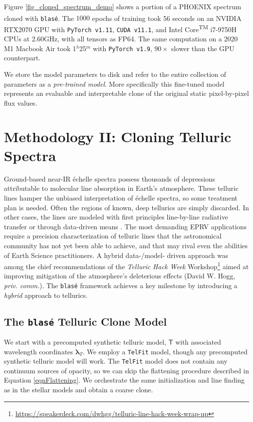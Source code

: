 \documentclass[twocolumn]{aastex631}
\begin{document}
Figure \ref{fig_cloned_spectrum_demo} shows a portion of a PHOENIX spectrum cloned with \texttt{blas\'e}. The $1000$ epochs of training took 56 seconds on an NVIDIA\textsuperscript{\tiny\textregistered} RTX2070 GPU with \texttt{PyTorch v1.11}, \texttt{CUDA v11.1}, and Intel\textsuperscript{\tiny\textregistered} Core\textsuperscript{\tiny TM} i7-9750H CPUs at 2.60GHz, with all tensors as FP64. The same computation on a 2020 M1 Macbook Air took 1$^h$25$^m$ with \texttt{PyTorch v1.9}, $90\times$ slower than the GPU counterpart.

We store the model parameters to disk and refer to the entire collection of parameters as a \emph{pre-trained model}.  More specifically this fine-tuned model represents an evaluable and interpretable clone of the original static pixel-by-pixel flux values.

\section{Methodology II: Cloning Telluric Spectra} \label{sectionTelluric}
Ground-based near-IR \'echelle spectra possess thousands of depressions attributable to molecular line absorption in Earth's atmosphere.  These telluric lines hamper the unbiased interpretation of \'echelle spectra, so some treatment plan is needed.  Often the regions of known, deep tellurics are simply discarded.  In other cases, the lines are modeled with first principles line-by-line radiative transfer \citep[\emph{e.g.} \texttt{TelFit,}][]{2014AJ....148...53G} or through data-driven means \citep[\emph{e.g.} \texttt{wobble,}][]{2019AJ....158..164B}.  The most demanding EPRV applications require a precision characterization of telluric lines that the astronomical community has not yet been able to achieve, and that may rival even the abilities of Earth Science practitioners.  A hybrid data-/model- driven approach was among the chief recommendations of the \emph{Telluric Hack Week} Workshop\footnote{\url{https://speakerdeck.com/dwhgg/telluric-line-hack-week-wrap-up}} aimed at improving mitigation of the atmosphere's deleterious effects (David W. Hogg, \emph{priv. comm.}).  The \texttt{blas\'e} framework achieves a key milestone by introducing a \emph{hybrid} approach to tellurics.

\subsection{The \texttt{blas\'e} Telluric Clone Model}
We start with a precomputed synthetic telluric model, $\mathsf{T}$ with associated wavelength coordinates $\bm{\lambda}_T$.  We employ a \texttt{TelFit} model, though any precomputed synthetic telluric model will work.  The \texttt{TelFit} model does not contain any continuum sources of opacity, so we can skip the flattening procedure described in Equation \ref{eqnFlattening}.  We orchestrate the same initialization and line finding as in the stellar models and obtain a coarse clone.
\end{document}
